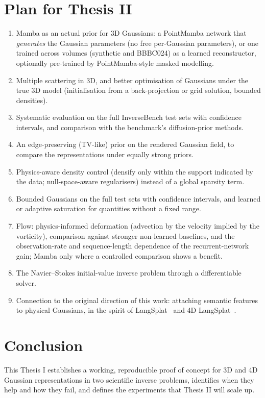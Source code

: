 \section{Plan for Thesis II}
\begin{enumerate}
  \item Mamba as an actual prior for 3D Gaussians: a PointMamba network that \emph{generates} the Gaussian parameters
  (no free per-Gaussian parameters), or one trained across volumes (synthetic and BBBC024) as a learned reconstructor,
  optionally pre-trained by PointMamba-style masked modelling.
  \item Multiple scattering in 3D, and better optimisation of Gaussians under the true 3D model (initialisation
  from a back-projection or grid solution, bounded densities).
  \item Systematic evaluation on the full InverseBench test sets with confidence intervals, and comparison with the
  benchmark's diffusion-prior methods.
  \item An edge-preserving (TV-like) prior on the rendered Gaussian field, to compare the representations under
  equally strong priors.
  \item Physics-aware density control (densify only within the support indicated by the data; null-space-aware
  regularisers) instead of a global sparsity term.
  \item Bounded Gaussians on the full test sets with confidence intervals, and learned or adaptive saturation for
  quantities without a fixed range.
  \item Flow: physics-informed deformation (advection by the velocity implied by the vorticity), comparison against
  stronger non-learned baselines, and the observation-rate and sequence-length dependence of the recurrent-network
  gain; Mamba only where a controlled comparison shows a benefit.
  \item The Navier--Stokes initial-value inverse problem through a differentiable solver.
  \item Connection to the original direction of this work: attaching semantic features to physical Gaussians, in the
  spirit of LangSplat~\citep{qin2024langsplat} and 4D LangSplat~\citep{li2025langsplat4d}.
\end{enumerate}

\section{Conclusion}
This Thesis I establishes a working, reproducible proof of concept for 3D and 4D Gaussian representations in two
scientific inverse problems, identifies when they help and how they fail, and defines the experiments that Thesis II
will scale up.

